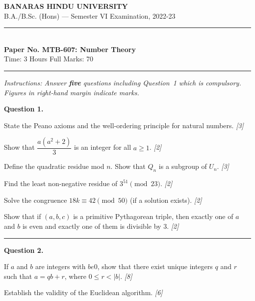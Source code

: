 \documentclass[11pt,a4paper]{article}
\newcommand{\pts}[1]{\hfill   \textit{[#1]}}
\begin{document}
\begin{center}
  {\large\bfseries BANARAS HINDU UNIVERSITY}\\[2pt]
  {\normalsize B.A./B.Sc. (Hons) --- Semester VI Examination, 2022-23}\\[6pt]
  \rule{0.8\linewidth}{0.5pt}\\[6pt]
  {\large\bfseries Paper No. MTB-607: Number Theory}\\[4pt]
  {\normalsize Time: 3 Hours \hfill Full Marks: 70}
\end{center}
\rule{\linewidth}{0.4pt}
\smallskip



\noindent   \textit{Instructions: Answer   \textbf{five} questions including Question~1 which is compulsory. Figures in right-hand margin indicate marks.}
\bigskip




\noindent   \textbf{Question 1.}

\begin{parts}
  \item State the Peano axioms and the well-ordering principle for natural numbers. \pts{3}
  \item Show that $\dfrac{a(a^2+2)}{3}$ is an integer for all $a \ge 1$. \pts{2}
  \item Define the quadratic residue mod $n$. Show that $Q_n$ is a subgroup of $U_n$. \pts{3}
  \item Find the least non-negative residue of $3^{51} \pmod{23}$. \pts{2}
  \item Solve the congruence $18k \equiv 42 \pmod{50}$ (if a solution exists). \pts{2}
  \item Show that if $(a,b,c)$ is a primitive Pythagorean triple, then exactly one of $a$ and $b$ is even and exactly one of them is divisible by $3$. \pts{2}
\end{parts}

\medskip\rule{\linewidth}{0.2pt}

\medskip


\noindent   \textbf{Question 2.}

\begin{parts}
  \item If $a$ and $b$ are integers with $b 
e 0$, show that there exist unique integers $q$ and $r$ such that $a = qb + r$, where $0 \le r < |b|$. \pts{8}
  \item Establish the validity of the Euclidean algorithm. \pts{6}
\end{parts}
\end{document}
